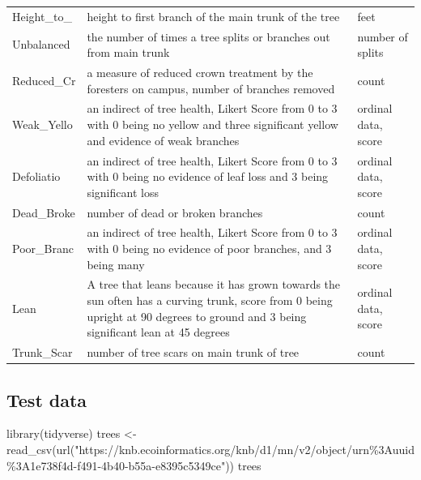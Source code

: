 \documentclass[
]{book}
\newenvironment{Shaded}{\begin{snugshade}}{\end{snugshade}}
\newcommand{\FunctionTok}[1]{\textcolor[rgb]{0.00,0.00,0.00}{#1}}
\newcommand{\NormalTok}[1]{#1}
\newcommand{\OtherTok}[1]{\textcolor[rgb]{0.56,0.35,0.01}{#1}}
\newcommand{\StringTok}[1]{\textcolor[rgb]{0.31,0.60,0.02}{#1}}
\begin{document}
\begin{tabular}{lll}
Height\_to\_ & height to first branch of the main trunk of the tree & feet\\
Unbalanced & the number of times a tree splits or branches out from main trunk & number of splits\\
\addlinespace
Reduced\_Cr & a measure of reduced crown treatment by the foresters on campus, number of branches removed & count\\
Weak\_Yello & an indirect of tree health, Likert Score from 0 to 3 with 0 being no yellow and three significant yellow and evidence of weak branches & ordinal data, score\\
Defoliatio & an indirect of tree health, Likert Score from 0 to 3 with 0 being no evidence of leaf loss and 3 being significant loss & ordinal data, score\\
Dead\_Broke & number of dead or broken branches & count\\
Poor\_Branc & an indirect of tree health, Likert Score from 0 to 3 with 0 being no evidence of poor branches, and 3 being many & ordinal data, score\\
\addlinespace
Lean & A tree that leans because it has grown towards the sun often has a curving trunk, score from 0 being upright at 90 degrees to ground and 3 being significant lean at 45 degrees & ordinal data, score\\
Trunk\_Scar & number of tree scars on main trunk of tree & count\\
\bottomrule
\end{tabular}

\hypertarget{test-data}{%
\subsection*{Test data}\label{test-data}}

\begin{Shaded}
\begin{Highlighting}[]
\FunctionTok{library}\NormalTok{(tidyverse)}
\NormalTok{trees }\OtherTok{\textless{}{-}} \FunctionTok{read\_csv}\NormalTok{(}\FunctionTok{url}\NormalTok{(}\StringTok{"https://knb.ecoinformatics.org/knb/d1/mn/v2/object/urn\%3Auuid\%3A1e738f4d{-}f491{-}4b40{-}b55a{-}e8395c5349ce"}\NormalTok{))  }
\NormalTok{trees}
\end{Highlighting}
\end{Shaded}
\end{document}
